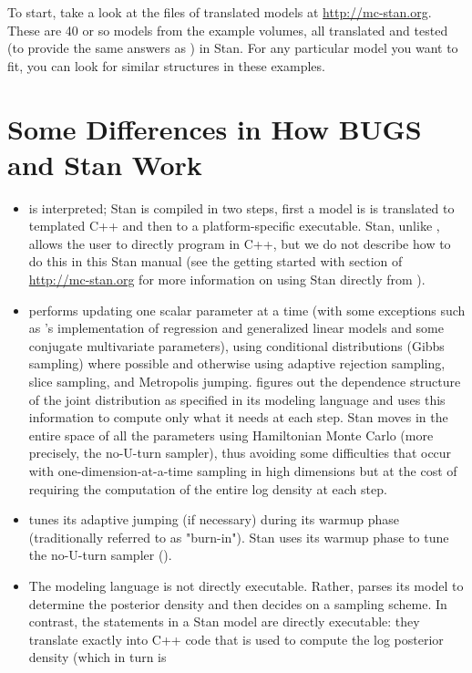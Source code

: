 To start, take a look at the files of translated \BUGS models at
\url{http://mc-stan.org}.  These are 40 or so models from the \BUGS
example volumes, all translated and tested (to provide the same
answers as \BUGS) in Stan.  For any particular model you want to fit,
you can look for similar structures in these examples.

\section{Some Differences in How BUGS and Stan Work}

\begin{itemize}
\item \BUGS is interpreted; Stan is compiled in two steps, first a
  model is is translated to templated C++ and then to a
  platform-specific executable.  Stan, unlike \BUGS, allows the user
  to directly program in C++, but we do not describe how to do this in
  this Stan manual (see the getting started with \Cpp section of
  \url{http://mc-stan.org} for more information on using Stan directly
  from \Cpp).
\item \BUGS performs \MCMC updating one scalar parameter at a time
  (with some exceptions such as \JAGS's implementation of regression
  and generalized linear models and some conjugate multivariate
  parameters), using conditional distributions (Gibbs sampling) where
  possible and otherwise using adaptive rejection sampling, slice
  sampling, and Metropolis jumping.  \BUGS figures out the dependence
  structure of the joint distribution as specified in its modeling
  language and uses this information to compute only what it needs at
  each step.  Stan moves in the entire space of all the parameters
  using Hamiltonian Monte Carlo (more precisely, the no-U-turn
  sampler), thus avoiding some difficulties that occur with
  one-dimension-at-a-time sampling in high dimensions but at the cost
  of requiring the computation of the entire log density at each step.
\item \BUGS tunes its adaptive jumping (if necessary) during its
  warmup phase (traditionally referred to as "burn-in").  Stan uses
  its warmup phase to tune the no-U-turn sampler (\NUTS).
\item The \BUGS modeling language is not directly executable.  Rather,
  \BUGS parses its model to determine the posterior density and then
  decides on a sampling scheme.  In contrast, the statements in a Stan
  model are directly executable: they translate exactly into C++ code
  that is used to compute the log posterior density (which in turn is

\end{itemize}
